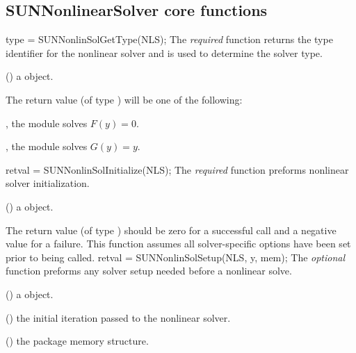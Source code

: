\subsection{SUNNonlinearSolver core functions}
\label{ss:sunnonlinsol_corefn}
{
  type = SUNNonlinSolGetType(NLS);
}
{
  The \textit{required} function  returns the
  type identifier for the nonlinear solver  and is used to
  determine the solver type.
}
{
  \begin{args}[NLS]
  \item[NLS] ()
    a {\sunnonlinsol} object.
  \end{args}
}
{
  The return value  (of type ) will be one of the
  following:
  \begin{args}
  \item[\Id{SUNNONLINEARSOLVER\_ROOTFIND}]
    , the {\sunnonlinsol} module solves $F(y) = 0$.
  \item[\Id{SUNNONLINEARSOLVER\_STATIONARY}]
    , the {\sunnonlinsol} module solves $G(y) = y$.
  \end{args}
}
{}
{
  retval = SUNNonlinSolInitialize(NLS);
}
{
  The \textit{required} function  preforms
  nonlinear solver initialization.
}
{
  \begin{args}[NLS]
  \item[NLS] ()
    a {\sunnonlinsol} object.
  \end{args}
}
{
  The return value  (of type ) should be zero for a
  successful call and a negative value for a failure.
}
{
  This function assumes all solver-specific options have been set prior
  to being called.
}
{
  retval = SUNNonlinSolSetup(NLS, y, mem);
}
{
  The \textit{optional} function  preforms any
  solver setup needed before a nonlinear solve.
}
{
  \begin{args}[NLS]
  \item[NLS] ()
    a {\sunnonlinsol} object.
  \item[y] ()
    the initial iteration passed to the nonlinear solver.
  \item[mem] ()
    the {\sundials} package memory structure.
  \end{args}
}
